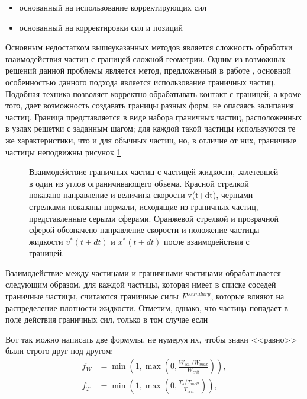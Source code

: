 \begin{itemize}
\item основанный на использование корректирующих сил \cite {Müller2004}
\item основанный на корректировки сил и позиций \cite {Becker2009}
\end{itemize}

Основным недостатком вышеуказанных методов является сложность обработки взаимодействия частиц с границей сложной геометрии. Одним из возможных решений данной проблемы является метод, предложенный в работе  \cite {Ihmsen2010}, основной особенностью данного подхода является использование граничных частиц. Подобная техника позволяет корректно обрабатывать контакт с границей, а кроме того, дает возможность создавать границы разных форм, не опасаясь залипания частиц. Граница представляется в виде набора граничных частиц, расположенных в узлах решетки с заданным шагом; для каждой такой частицы используются те же характеристики, что и для обычных частиц, но, в отличие от них, граничные частицы неподвижны рисунок \ref{fig:boundary}
\begin{figure}[ht]
  \caption{Взаимодействие граничных частиц с частицей жидкости, залетевшей в один из углов ограничивающего объема. Красной стрелкой показано направление и величина скорости v(t+dt), черными стрелками показаны нормали, исходящие из граничных частиц, представленные серыми сферами. Оранжевой стрелкой и прозрачной сферой обозначено направление скорости и положение частицы жидкости \(v^{*}(t+dt)\) и \(x^{*}(t+dt)\) после взаимодействия с границей.}
\label{fig:boundary}
\end{figure}

Взаимодействие между частицами и граничными частицами обрабатывается следующим образом, для каждой частицы, которая имеет в списке соседей граничные частицы, считаются граничные силы \(F^{boundary}\), которые влияют на распределение плотности жидкости. Отметим, однако, что частица попадает в поле действия граничных сил, только в том случае если 

Вот так можно написать две формулы, не нумеруя их, чтобы знаки <<равно>> были
строго друг под другом:
\begin{align}
  f_W & =  \min \left( 1, \max \left( 0, \frac{W_{soil} / W_{max}}{W_{crit}} \right)  \right), \nonumber \\
  f_T & =  \min \left( 1, \max \left( 0, \frac{T_s / T_{melt}}{T_{crit}} \right)  \right), \nonumber
\end{align}

